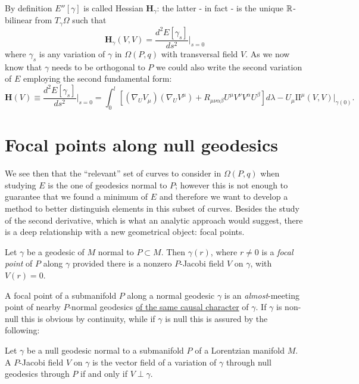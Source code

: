 By definition \(E''[\gamma]\) is called Hessian \(\textbf{H}_{\gamma}\): the latter - in fact - is the unique \({\mathbb{R}}\)-bilinear from \(T_{\gamma}\Omega\) such that 
\[
\textbf{H}_{\gamma}(V, V) = \frac{d^2E[\gamma_s]}{ds^2}\Big\vert_{s = 0}
\]
where \(\gamma_s\) is any variation of \(\gamma\) in \(\Omega(P, q)\) with transversal field \(V\).
As we now know that \(\gamma\) needs to be orthogonal to \(P\) we could also write the second variation of \(E\) employing the second fundamental form:
{\small
	\begin{equation}
	\label{eq:hessian}
	\textbf{H}(V) \equiv\frac{d^2E[\gamma_s]}{ds^2}\Big\vert_{s = 0} = 
	\int_{0}^{l} \left[(\nabla_UV_{\mu})(\nabla_UV^{\mu}) + R_{\mu\nu\alpha\beta}U^{\mu}V^{\nu}V^{\alpha}U^{\beta}\right] d\lambda - U_{\mu}\mathrm{I\!I}^{\mu}(V, V)\Big\vert_{\gamma(0)}.
\end{equation}}

\section{Focal points along null geodesics}
\label{sec:fp-index-forms}
We see then that the ``relevant'' set of curves to consider in \(\Omega(P, q)\) when studying \(E\) is the one of geodesics normal to \(P\); however this is not enough to guarantee that we found a minimum of \(E\) and therefore we want to develop a method to better distinguish elements in this subset of curves. Besides the study of the second derivative, which is what an analytic approach would suggest, there is a deep relationship with a new geometrical object: focal points.

\vskip 4pt

\begin{definition}
	Let \(\gamma\) be a geodesic of \(M\) normal to \(P \subset M\). Then \(\gamma(r)\), where \(r \neq 0\) is a \emph{focal point} of \(P\) along \(\gamma\) provided there is a nonzero \(P\)-Jacobi field \(V\) on \(\gamma\), with \(V(r) = 0\).
\end{definition}

A focal point of a submanifold \(P\) along a normal geodesic \(\gamma\) is an \emph{almost}-meeting point of nearby \(P\)-normal geodesics \underline{of the same causal character} of \(\gamma\). If \(\gamma\) is non-null this is obvious by continuity, while if \(\gamma\) is null this is assured by the following:
\begin{corollary}
	\label{cor:same-causal-character}
	Let \(\gamma\) be a null geodesic normal to a submanifold \(P\) of a Lorentzian manifold \(M\). A \(P\)-Jacobi field \(V\) on \(\gamma\) is the vector field of a variation of \(\gamma\) through null geodesics through \(P\) if and only if \(V \perp \gamma\).
\end{corollary}

